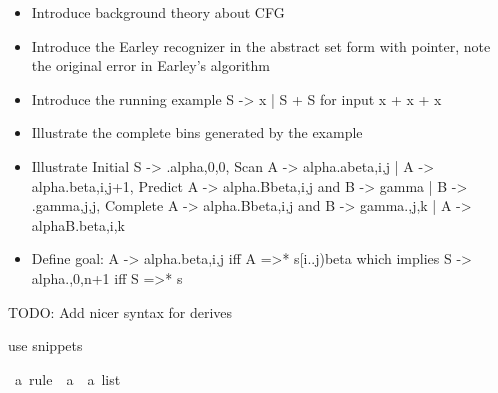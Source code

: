 %
\begin{isabellebody}%
%
%
\isadelimtheory
%
\endisadelimtheory
%
\isatagtheory
%
\endisatagtheory
{\isafoldtheory}%
%
\isadelimtheory
%
\endisadelimtheory
%
\isadelimdocument
%
\endisadelimdocument
%
\isatagdocument
%
\isamarkuptrue%
%
\isamarkuptrue%
%
\endisatagdocument
{\isafolddocument}%
%
\isadelimdocument
%
\endisadelimdocument
%
\begin{isamarkuptext}%
\begin{itemize}
    \item Introduce background theory about CFG
    \item Introduce the Earley recognizer in the abstract set form with pointer, note the original error in Earley's algorithm \\
    \item Introduce the running example S -> x | S + S for input x + x + x \\
    \item Illustrate the complete bins generated by the example \\
    \item Illustrate Initial S -> .alpha,0,0, Scan A -> alpha.abeta,i,j | A -> alpha.beta,i,j+1,
      Predict A -> alpha.Bbeta,i,j and B -> gamma | B -> .gamma,j,j,
      Complete A -> alpha.Bbeta,i,j and B -> gamma.,j,k | A -> alphaB.beta,i,k \\
    \item Define goal: A -> alpha.beta,i,j iff A =>* s[i..j)beta which implies S -> alpha.,0,n+1 iff S =>* s \\
  \end{itemize}%
\end{isamarkuptext}\isamarkuptrue%
%
\begin{isamarkuptext}%
TODO: Add nicer syntax for derives%
\end{isamarkuptext}\isamarkuptrue%
%
\isadelimdocument
%
\endisadelimdocument
%
\isatagdocument
%
\isamarkuptrue%
%
\endisatagdocument
{\isafolddocument}%
%
\isadelimdocument
%
\endisadelimdocument
%
\begin{isamarkuptext}%
use snippets%
\end{isamarkuptext}\isamarkuptrue%
\isamarkupfalse%
\ {\isacharprime}{\kern0pt}a\ rule\ {\isacharequal}{\kern0pt}\ {\isachardoublequoteopen}{\isacharprime}{\kern0pt}a\ {\isasymtimes}\ {\isacharprime}{\kern0pt}a\ list{\isachardoublequoteclose}\isanewline

\end{isabellebody}
